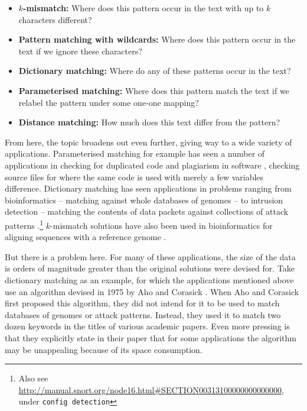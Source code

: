 \documentclass[a4paper,11pt]{article}
\begin{document}
    \begin{itemize}
        \item \textbf{$k$-mismatch:} Where does this pattern occur in the text with up to $k$ characters different?
        \item \textbf{Pattern matching with wildcards:} Where does this pattern occur in the text if we ignore these characters?
        \item \textbf{Dictionary matching:} Where do any of these patterns occur in the text?
        \item \textbf{Parameterised matching:} Where does this pattern match the text if we relabel the pattern under some one-one mapping?
        \item \textbf{Distance matching:} How much does this text differ from the pattern?
    \end{itemize}

    From here, the topic broadens out even further, giving way to a wide variety of applications. Parameterised matching for example has seen a number of applications in checking for duplicated code \cite{Baker:1993:TPP:167088.167115} and plagiarism in software \cite{Pandey:plagiarism}, checking source files for where the same code is used with merely a few variables difference. Dictionary matching has seen applications in problems ranging from bioinformatics -- matching against whole databases of genomes \cite{15713233} -- to intrusion detection -- matching the contents of data packets against collections of attack patterns \cite{1354682}.\footnote{Also see \url{http://manual.snort.org/node16.html\#SECTION00313100000000000000}, under \texttt{config detection}} $k$-mismatch solutions have also been used in bioinformatics for aligning sequences with a reference genome \cite{Tennakoon10062012}.

    But there is a problem here. For many of these applications, the size of the data is orders of magnitude greater than the original solutions were devised for. Take dictionary matching as an example, for which the applications mentioned above use an algorithm devised in 1975 by Aho and Corasick \cite{Aho:1975:ESM:360825.360855}. When Aho and Corasick first proposed this algorithm, they did not intend for it to be used to match databases of genomes or attack patterns. Instead, they used it to match two dozen keywords in the titles of various academic papers. Even more pressing is that they explicitly state in their paper that for some applications the algorithm may be unappealing because of its space consumption.
\end{document}
